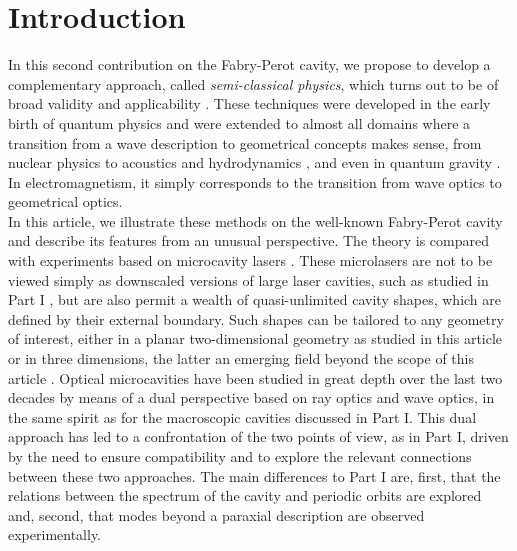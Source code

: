 \documentclass[10pt]{iopart}
\begin{document}
\section{Introduction}

In this second contribution on the Fabry-Perot cavity, we propose to develop a complementary approach, called \emph{semi-classical physics}, which turns out to be of broad validity and applicability \cite{brack,stoeckmann-livre}. These techniques were developed in the early birth of quantum physics \cite{stone-physicstoday} and were extended to almost all domains where a transition from a wave description to geometrical concepts makes sense, from nuclear physics \cite{bohigas} to acoustics \cite{acoustique-mortessagne} and hydrodynamics \cite{chaos-hydro}, and even in quantum gravity \cite{gravitequantique-bianchi}. In electromagnetism, it simply corresponds to the transition from wave optics to geometrical optics.\\

In this article, we illustrate these methods on the well-known Fabry-Perot cavity and describe its features from an unusual perspective. The theory is compared with experiments based on microcavity lasers \cite{matsko-livre,Cao2015}. These microlasers are not to be viewed simply as downscaled versions of large laser cavities, such as studied in Part I \cite{PartI}, but are also permit a wealth of quasi-unlimited cavity shapes, which are defined by their external boundary. Such shapes can be tailored to any geometry of interest, either in a planar two-dimensional geometry as studied in this article or in three dimensions, the latter an emerging field beyond the scope of this article \cite{OE-3D}. Optical microcavities have been studied in great depth over the last two decades by means of a dual perspective based on ray optics and wave optics, in the same spirit as for the macroscopic cavities discussed in Part I. This dual approach has led to a confrontation of the two points of view, as in Part I, driven by the need to ensure compatibility and to explore the relevant connections between these two approaches. The main differences to Part I are, first, that the relations between the spectrum of the cavity and periodic orbits are explored and, second, that modes beyond a paraxial description are observed experimentally.\\
\end{document}
